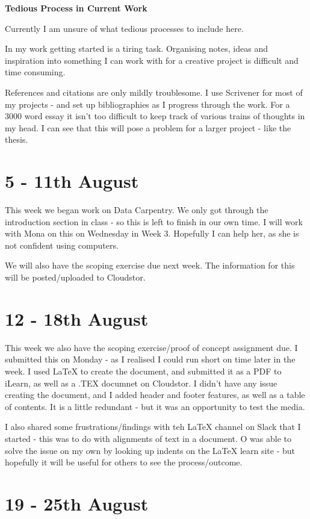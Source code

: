 \documentclass{article}
\begin{document}
\textbf{Tedious Process in Current Work}

Currently I am unsure of what tedious processes to include here.

In my work getting started is a tiring task. Organising notes, ideas and inspiration into something I can work with for a creative project is difficult and time consuming.

References and citations are only mildly troublesome. I use Scrivener for most of my projects - and set up bibliographies as I progress through the work. For a 3000 word essay it isn't too difficult to keep track of various trains of thoughts in my head. I can see that this will pose a problem for a larger project - like the thesis.

\section{5 - 11th August}

This week we began work on Data Carpentry. We only got through the introduction section in class - so this is left to finish in our own time. I will work with Mona on this on Wednesday in Week 3. Hopefully I can help her, as she is not confident using computers. 

We will also have the scoping exercise due next week. The information for this will be posted/uploaded to Cloudstor.


\section{12 - 18th August}

This week we also have the scoping exercise/proof of concept assignment due. I submitted this on Monday - as I realised I could run short on time later in the week. 
I used LaTeX to create the document, and submitted it as a PDF to iLearn, as well as a .TEX documnet on Cloudstor. 
I didn't have any issue creating the document, and I added header and footer features, as well as a table of contents. 
It is a little redundant - but it was an opportunity  to test the media. 

I also shared some frustrations/findings with teh LaTeX channel on Slack that I started - this was to do with alignments of text in a document. O was able to solve the issue on my own by looking up indents on the LaTeX learn site - but hopefully it will be useful for others to see the process/outcome.

\section{19 - 25th August}
\end{document}

